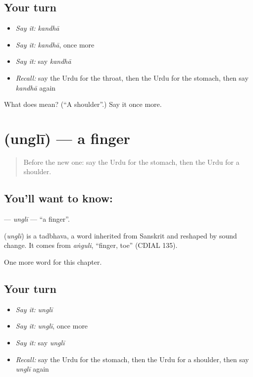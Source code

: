 \subsection*{Your turn}
\begin{itemize}
\raggedright
  \item \emph{Say it:} \emph{kandhā}
  \item \emph{Say it:} \emph{kandhā}, once more
  \item \emph{Say it:} say \emph{kandhā}
  \item \emph{Recall:} say the Urdu for the throat, then the Urdu for the stomach, then say \emph{kandhā} again
\end{itemize}

\begin{tcolorbox}[breakable,colback=teal!4,colframe=teal!35!black,title={Before you move on}]
What does  mean? (\textquotedblleft{}A shoulder\textquotedblright{}.) Say it once more.
\end{tcolorbox}
\section[\texorpdfstring{\ur{انگلی} (unglī)}{انگلی (unglī)}]{ (unglī) — a finger}

\label{lesson:UR-C39-ungli}



\begin{quote}
Before the new one: say the Urdu for the stomach, then the Urdu for a shoulder.
\end{quote}

\subsection*{You'll want to know: }
\textbf{} — \emph{unglī} — \textquotedblleft{}a finger\textquotedblright{}.

\begin{cousinweb}
\textbf{} (\emph{unglī}) is a tadbhava, a word inherited from Sanskrit and reshaped by sound change. It comes from \emph{aṅguli}, \textquotedblleft{}finger, toe\textquotedblright{} (CDIAL 135).
\end{cousinweb}

\begin{grammarlens}[title={What you've built}]
One more word for this chapter.
\end{grammarlens}

\subsection*{Your turn}
\begin{itemize}
\raggedright
  \item \emph{Say it:} \emph{unglī}
  \item \emph{Say it:} \emph{unglī}, once more
  \item \emph{Say it:} say \emph{unglī}
  \item \emph{Recall:} say the Urdu for the stomach, then the Urdu for a shoulder, then say \emph{unglī} again
\end{itemize}

